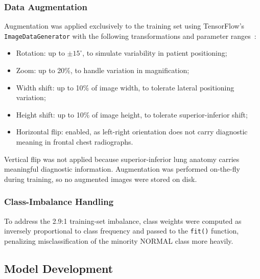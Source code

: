 \documentclass[preprint,12pt]{elsarticle}
\begin{document}
\subsubsection{Data Augmentation}
Augmentation was applied exclusively to the training set using
TensorFlow's \texttt{ImageDataGenerator} with the following
transformations and parameter ranges~\cite{shorten2019}:
\begin{itemize}
  \item Rotation: up to $\pm 15^{\circ}$, to simulate variability in
        patient positioning;
  \item Zoom: up to 20\%, to handle variation in magnification;
  \item Width shift: up to 10\% of image width, to tolerate lateral
        positioning variation;
  \item Height shift: up to 10\% of image height, to tolerate
        superior-inferior shift;
  \item Horizontal flip: enabled, as left-right orientation does not
        carry diagnostic meaning in frontal chest radiographs.
\end{itemize}
Vertical flip was not applied because superior-inferior lung anatomy
carries meaningful diagnostic information.
Augmentation was performed on-the-fly during training, so no
augmented images were stored on disk.

\subsubsection{Class-Imbalance Handling}
To address the 2.9:1 training-set imbalance, class weights were
computed as inversely proportional to class frequency and passed to
the \texttt{fit()} function, penalizing misclassification of the
minority NORMAL class more heavily.

\subsection{Model Development}
\end{document}

